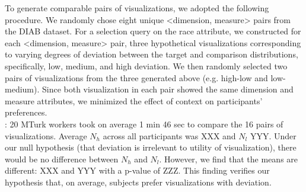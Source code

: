 To generate comparable pairs of visualizations, we adopted the following procedure.
We randomly chose eight unique <dimension, measure> pairs from the DIAB dataset.
For a selection query on the race attribute, we constructed for each <dimension, measure> pair, three hypothetical visualizations corresponding to varying degrees of deviation between the target and comparison distributions, specifically, low, medium, and high deviation.
We then randomly selected two pairs of visualizations from the three generated above (e.g. high-low and low-medium).
Since both visualization in each pair showed the same dimension and measure attributes, we minimized the effect of context on participants' preferences.\\
: 20 MTurk workers took on average 
1 min 46 sec to compare the 16 pairs of visualizations.
Average $N_h$ across all participants was XXX and $N_l$ YYY.
Under our null hypothesis (that deviation is irrelevant to utility of visualization),
there would be no difference between $N_{h}$ and $N_{l}$.
However, we find that the means are different: XXX and YYY with a p-value of ZZZ.
This finding verifies our hypothesis that, on average, subjects prefer visualizations with deviation.



% 

